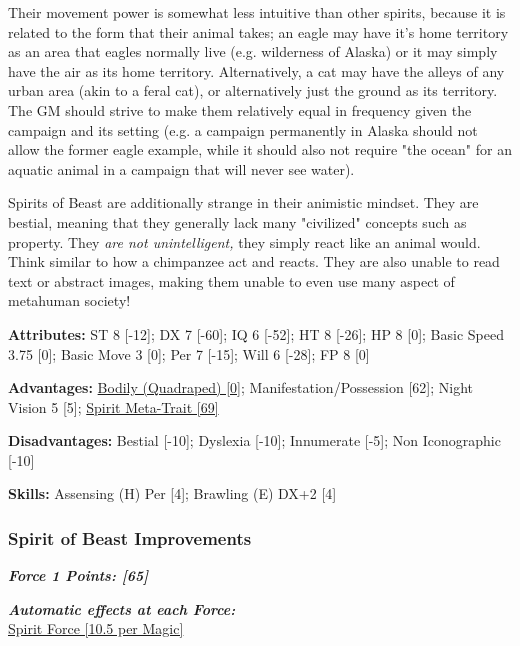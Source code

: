 \begin{multicols*}{3}
	Their movement power is somewhat less intuitive than other spirits, because it is related to the form that their animal takes; an eagle may have it's home territory as an area that eagles normally live (e.g. wilderness of Alaska) or it may simply have the air as its home territory. Alternatively, a cat may have the alleys of any urban area (akin to a feral cat), or alternatively just the ground as its territory. The GM should strive to make them relatively equal in frequency given the campaign and its setting (e.g. a campaign permanently in Alaska should not allow the former eagle example, while it should also not require "the ocean" for an aquatic animal in a campaign that will never see water).
	
	Spirits of Beast are additionally strange in their animistic mindset. They are bestial, meaning that they generally lack many "civilized" concepts such as property. They \textit{are not unintelligent,} they simply react like an animal would. Think similar to how a chimpanzee act and reacts. They are also unable to read text or abstract images, making them unable to even use many aspect of metahuman society!
	
	\textbf{Attributes:}
	ST 8 [-12]; DX 7 [-60]; IQ 6 [-52]; HT 8 [-26]; HP 8 [0]; Basic Speed 3.75 [0]; Basic Move 3 [0]; Per 7 [-15]; Will 6 [-28]; FP 8 [0]
	
	\textbf{Advantages:}
	\hyperref[elemental]{Bodily (Quadraped) [0]}; Manifestation/Possession [62]; Night Vision 5 [5]; \hyperref[spirit_meta_trait]{Spirit Meta-Trait [69]}
	
	\textbf{Disadvantages:} 
	Bestial [-10]; Dyslexia [-10]; Innumerate [-5]; Non Iconographic [-10]
	
	\textbf{Skills:} 
	Assensing (H) Per [4]; Brawling (E) DX+2 [4]
	
	\subsubsection*{Spirit of Beast Improvements}
	
	\textbf{\textit{Force 1 Points: [65]}}
	
	\textbf{\textit{Automatic effects at each Force:\\}}
	\hyperref[spirit_force]{Spirit Force [10.5 per Magic]}\\\\
	

\end{multicols*}
